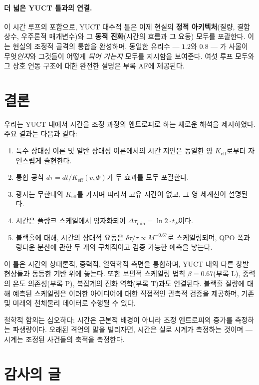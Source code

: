 \documentclass[12pt,a4paper]{article}
\newcommand{\Keff}{K_{\mathrm{eff}}}
\begin{document}
	\paragraph{더 넓은 YUCT 틀과의 연결.}
	이 시간 루프의 포함으로, YUCT 대수적 틀은 이제 현실의 \textbf{정적 아키텍처}(질량, 결합 상수, 우주론적 매개변수)와 그 \textbf{동적 진화}(시간의 흐름과 그 요동) 모두를 포괄한다. 이는 현실의 조정적 골격의 통합을 완성하며, 동일한 유리수 — \(1.2\)와 \(0.8\) — 가 사물이 무엇\textit{인지}와 그것들이 어떻게 \textit{되어 가는지} 모두를 지시함을 보여준다. 여섯 루프 모두와 그 상호 연동 구조에 대한 완전한 설명은 부록 AF에 제공된다.
	
	\section{결론}
	
	우리는 YUCT 내에서 시간을 조정 과정의 엔트로피로 하는 새로운 해석을 제시하였다. 주요 결과는 다음과 같다:
	\begin{enumerate}
		\item 특수 상대성 이론 및 일반 상대성 이론에서의 시간 지연은 동일한 양 \(\Keff\)로부터 자연스럽게 출현한다.
		\item 통합 공식 \(d\tau = dt/\Keff(v,\Phi)\)가 두 효과를 모두 포괄한다.
		\item 광자는 무한대의 \(\Keff\)를 가지며 따라서 고유 시간이 없고, 그 영 세계선이 설명된다.
		\item 시간은 플랑크 스케일에서 양자화되어 \(\Delta \tau_{\min} = \ln 2 \cdot t_P\)이다.
		\item 블랙홀에 대해, 시간의 상대적 요동은 \(\delta\tau/\tau \propto M^{-0.67}\)로 스케일링되며, QPO 폭과 링다운 분산에 관한 두 개의 구체적이고 검증 가능한 예측을 낳는다.
	\end{enumerate}
	
	이 틀은 시간의 상대론적, 중력적, 열역학적 측면을 통합하며, YUCT 내의 다른 창발 현상들과 동등한 기반 위에 놓는다. 또한 보편적 스케일링 법칙 \(\beta = 0.67\)(부록 L), 중력의 온도 의존성(부록 P), 복잡계의 진화 역학(부록 T)과도 연결된다. 블랙홀 질량에 대해 예측된 스케일링은 이러한 아이디어에 대한 직접적인 관측적 검증을 제공하며, 기존 및 미래의 천체물리 데이터로 수행될 수 있다.
	
	철학적 함의는 심오하다: 시간은 근본적 배경이 아니라 조정 엔트로피의 증가를 측정하는 파생량이다. 오래된 격언의 말을 빌리자면, 시간은 실로 시계가 측정하는 것이며 — 시계는 조정된 사건들의 축적을 측정한다.
	
	\section*{감사의 글}
	
\end{document}
